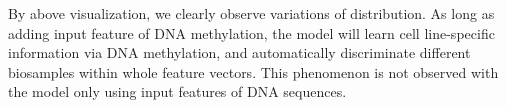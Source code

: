 By above visualization, we clearly observe variations of distribution. As long as adding input feature of DNA methylation, the model will learn cell line-specific information via DNA methylation, and automatically discriminate different biosamples within whole feature vectors. This phenomenon is not observed with the model only using input features of DNA sequences.
